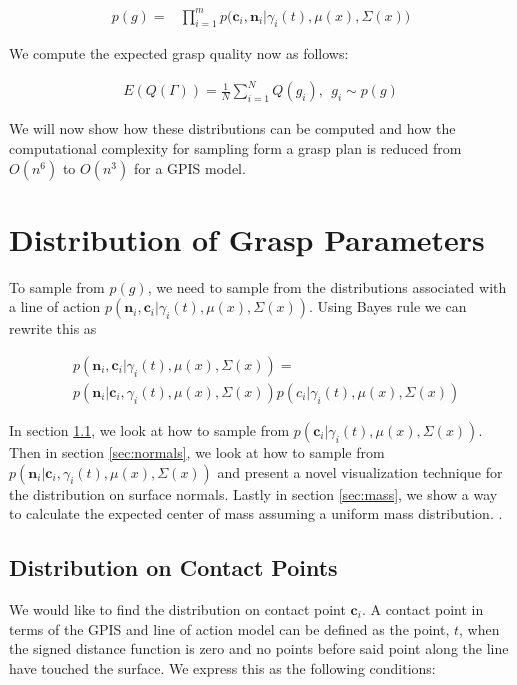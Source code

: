 \documentclass[letterpaper, 10 pt, conference]{ieeeconf}  %
\begin{document}
\vspace{-2ex}
\begin{align}\label{eq:independence}
p(g) = &\prod_{i=1}^mp\big(\textbf{c}_i,\textbf{n}_i|\gamma_i(t),\mu(x),\Sigma(x)\big)
\end{align}

We compute the expected grasp quality now as follows: 

\vspace{-2ex}
\begin{align}\label{eq:grasp_sampling}
E(Q(\Gamma)) = \frac{1}{N} \sum_{i=1}^N Q(g_i) , \ \ g_i \sim p(g)
\end{align}

We will now show how these distributions can be computed and how the computational complexity for sampling form a grasp plan is reduced from $O(n^6)$ to $O(n^3)$ for a GPIS model. 

\section{Distribution of Grasp Parameters}
\label{sec:distgrasp}
 
 To sample from $p(g)$, we need to sample from the distributions associated with a line of action $p(\textbf{n}_i,\textbf{c}_i|\gamma_i(t),\mu(x),\Sigma(x))$. Using Bayes rule we can rewrite this as 
 
 \vspace{-2ex}
 \begin{align*}
 &p(\textbf{n}_i,\textbf{c}_i|\gamma_i(t),\mu(x),\Sigma(x))=\\
 &p(\textbf{n}_i|\textbf{c}_i,\gamma_i(t),\mu(x),\Sigma(x))p(c_i|\gamma_i(t),\mu(x),\Sigma(x))
 \end{align*}
 
 In section \ref{sec:contact}, we look at how to sample from $p(\textbf{c}_i|\gamma_i(t),\mu(x),\Sigma(x))$. Then in section \ref{sec:normals}, we look at how to sample from $p(\textbf{n}_i|\textbf{c}_i,\gamma_i(t),\mu(x),\Sigma(x))$ and present a novel visualization technique for the distribution on surface normals. Lastly in section \ref{sec:mass}, we show a way to calculate the expected center of mass assuming a uniform mass distribution. 
 .
\subsection{Distribution on Contact Points}\label{sec:contact} 
We would like to find the distribution on contact point $\textbf{c}_i$. A contact point in terms of the GPIS and line of action model can be defined as the point, $t$, when the signed distance function is zero and no points before said point along the line have touched the surface. We express this as the following conditions: 
\end{document}
